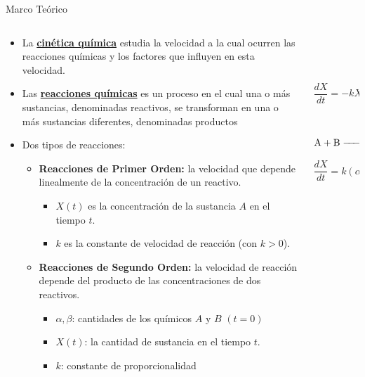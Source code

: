 \documentclass[
  10pt,
  ignorenonframetext,
  aspectratio=169,
]{beamer}
\providecommand{\tightlist}{%
  \setlength{\itemsep}{0pt}\setlength{\parskip}{0pt}}
\begin{document}
\begin{frame}{Marco Teórico}
\begin{columns}[T]
\begin{column}{0.7\textwidth}
\begin{itemize}
\tightlist
\item
  La \ul{\textbf{cinética química}} estudia la velocidad a la cual
  ocurren las reacciones químicas y los factores que influyen en esta
  velocidad.
\item
  Las \ul{\textbf{reacciones químicas}} es un proceso en el cual una o
  más sustancias, denominadas reactivos, se transforman en una o más
  sustancias diferentes, denominadas productos
\item
  Dos tipos de reacciones:

  \begin{itemize}
  \tightlist
  \item
    \textbf{Reacciones de Primer Orden:} la velocidad que depende
    linealmente de la concentración de un reactivo.

    \begin{itemize}
    \tightlist
    \item
      \(X(t)\) es la concentración de la sustancia \(A\) en el tiempo
      \(t\).
    \item
      \(k\) es la constante de velocidad de reacción (con \(k>0\)).
    \end{itemize}
  \item
    \textbf{Reacciones de Segundo Orden:} la velocidad de reacción
    depende del producto de las concentraciones de dos reactivos.

    \begin{itemize}
    \tightlist
    \item
      \(\alpha, \beta\): cantidades de los químicos \(A\) y \(B\)
      \((t=0)\)
    \item
      \(X(t)\): la cantidad de sustancia en el tiempo \(t\).
    \item
      \(k\): constante de proporcionalidad
    \end{itemize}
  \end{itemize}
\end{itemize}
\end{column}

\begin{column}{0.3\textwidth}
\(~\)

\(~\)

\[\frac{dX}{dt} = -kX\]

\(~\)

\[\ce{A + B -> C}\]

\[\frac{dX}{dt} = k(\alpha - X)(\beta - X)\]
\end{column}
\end{columns}
\end{frame}
\end{document}
